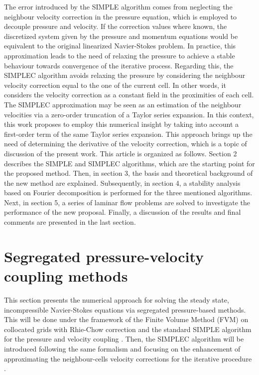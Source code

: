 \documentclass[final,3p,times,11pt,onecolumn]{myElsarticle}
\numberwithin{equation}{section}
\begin{document}
The error introduced by the SIMPLE algorithm comes from neglecting the neighbour velocity correction in the pressure equation, which is employed to decouple pressure and velocity. If the correction values where known, the discretized system given by the pressure and momentum equations would be equivalent to the original linearized Navier-Stokes problem. In practice, this approximation leads to the need of relaxing the pressure to achieve a stable behaviour towards convergence of the iterative process. Regarding this, the SIMPLEC algorithm avoids relaxing the pressure by considering the neighbour velocity correction equal to the one of the current cell. In other words, it considers the velocity correction as a constant field in the proximities of each cell. The SIMPLEC approximation may be seen as an estimation of the neighbour velocities via a zero-order truncation of a Taylor series expansion. In this context, this work proposes to employ this numerical insight by taking into account a first-order term of the same Taylor series expansion. This approach brings up the need of determining the derivative of the velocity correction, which is a topic of discussion of the present work. This article is organized as follows. Section 2 describes the SIMPLE and SIMPLEC algorithms, which are the starting point for the proposed method. Then, in section 3, the basis and theoretical background of the new method are explained. Subsequently, in section 4, a stability analysis based on Fourier decomposition is performed for the three mentioned algorithms. Next, in section 5, a series of laminar flow problems are solved to investigate the performance of the new proposal. Finally, a discussion of the results and final comments are presented in the last section.

\section{Segregated pressure-velocity coupling methods} \label{sec:theory}

This section presents the numerical approach for solving the steady state, incompressible Navier-Stokes equations via segregated pressure-based methods. This will be done under the framework of the Finite Volume Method (FVM) on collocated grids with Rhie-Chow correction \cite{rhiechow} and the standard SIMPLE algorithm for the pressure and velocity coupling \cite{patankar1972}. Then, the SIMPLEC algorithm will be introduced \cite{vanDoormal} following the same formalism and focusing on the enhancement of approximating the neighbour-cells velocity corrections for the iterative procedure \cite{moukalled}.
\end{document}
